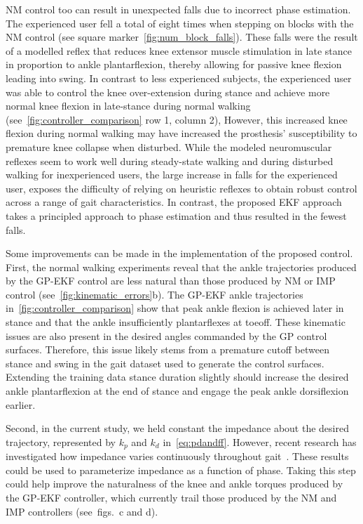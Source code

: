 NM control too can result in unexpected falls due to incorrect phase estimation.
The experienced user fell a total of eight times when stepping on blocks with
the NM control (see square marker~\cref{fig:num_block_falls}). These falls were
the result of a modelled reflex that reduces knee extensor muscle stimulation in
late stance in proportion to ankle plantarflexion, thereby allowing for passive
knee flexion leading into swing. In contrast to less experienced subjects, the
experienced user was able to control the knee over-extension during stance and
achieve more normal knee flexion in late-stance during normal walking
(see~\cref{fig:controller_comparison} row 1, column 2), However, this increased
knee flexion during normal walking may have increased the prosthesis'
susceptibility to premature knee collapse when disturbed. While the modeled
neuromuscular reflexes seem to work well during steady-state walking and during
disturbed walking for inexperienced users, the large increase in falls for the
experienced user, exposes the difficulty of relying on heuristic reflexes to
obtain robust control across a range of gait characteristics. In contrast, the
proposed EKF approach takes a principled approach to phase estimation and thus
resulted in the fewest falls.

Some improvements can be made in the implementation of the proposed control.
First, the normal walking experiments reveal that the ankle trajectories
produced by the GP-EKF control are less natural than those produced by NM or IMP
control (see~\cref{fig:kinematic_errors}b). The GP-EKF ankle trajectories
in~\cref{fig:controller_comparison} show that peak ankle flexion is achieved
later in stance and that the ankle insufficiently plantarflexes at toeoff.
These kinematic issues are also present in the desired angles commanded by the
GP control surfaces. Therefore, this issue likely stems from a premature cutoff
between stance and swing in the gait dataset used to generate the control
surfaces. Extending the training data stance duration slightly should increase
the desired ankle plantarflexion at the end of stance and engage the peak ankle
dorsiflexion earlier. 

Second, in the current study, we held constant the impedance about the desired
trajectory, represented by $k_p$ and $k_d$ in~\cref{eq:pdandff}. However, recent
research has investigated how impedance varies continuously throughout
gait~\citep{lee2016summary}. These results could be used to parameterize
impedance as a function of phase. Taking this step could help improve the
naturalness of the knee and ankle torques produced by the GP-EKF controller,
which currently trail those produced by the NM and IMP controllers
(see~figs.~c and d).


